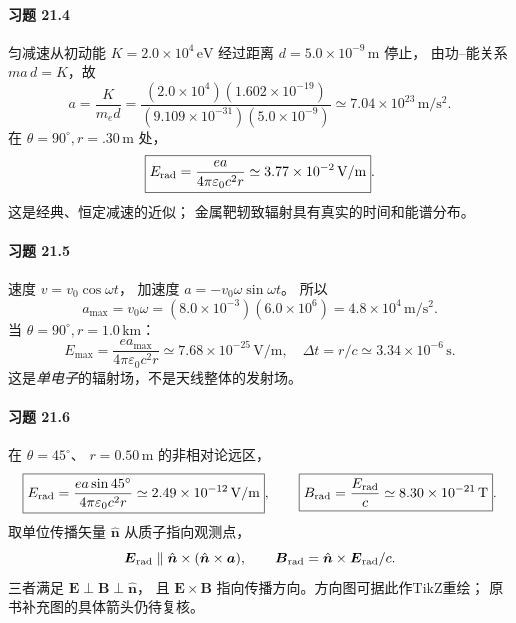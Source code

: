 \paragraph{习题 21.4}
匀减速从初动能 \(K=2.0\times10^4\,\mathrm{eV}\)
经过距离 \(d=5.0\times10^{-9}\,\mathrm m\) 停止，
由功--能关系
\(ma\,d=K\)，故
\[
a=\frac{K}{m_ed}
=\frac{(2.0\times10^4)(1.602\times10^{-19})}
{(9.109\times10^{-31})(5.0\times10^{-9})}
\simeq7.04\times10^{23}\,\mathrm{m/s^2}.
\]
在 \(\theta=90^\circ,r=.30\,\mathrm m\) 处，
\[
\boxed{E_{\rm rad}=
\frac{ea}{4\pi\varepsilon_0c^2r}
\simeq3.77\times10^{-2}\,\mathrm{V/m}}.
\]
这是经典、恒定减速的近似；
金属靶轫致辐射具有真实的时间和能谱分布。

\paragraph{习题 21.5}
速度 \(v=v_0\cos\omega t\)，
加速度 \(a=-v_0\omega\sin\omega t\)。
所以
\[
\boxed{a_{\max}=v_0\omega
=(8.0\times10^{-3})(6.0\times10^6)
=4.8\times10^4\,\mathrm{m/s^2}}.
\]
当 \(\theta=90^\circ,r=1.0\,\mathrm{km}\)：
\[
\boxed{E_{\max}=
\frac{ea_{\max}}{4\pi\varepsilon_0c^2r}
\simeq7.68\times10^{-25}\,\mathrm{V/m}},\quad
\boxed{\Delta t=r/c\simeq3.34\times10^{-6}\,\mathrm s}.
\]
这是\emph{单电子}的辐射场，不是天线整体的发射场。

\paragraph{习题 21.6}
在 \(\theta=45^\circ\)、
\(r=0.50\,\mathrm m\) 的非相对论远区，
\[
\boxed{E_{\rm rad}=
\frac{ea\sin45^\circ}{4\pi\varepsilon_0c^2r}
\simeq2.49\times10^{-12}\,\mathrm{V/m}},
\qquad
\boxed{B_{\rm rad}=\frac{E_{\rm rad}}c
\simeq8.30\times10^{-21}\,\mathrm T}.
\]
取单位传播矢量 \(\hat{\boldsymbol n}\) 从质子指向观测点，
\[
\boldsymbol E_{\rm rad}\parallel
\hat{\boldsymbol n}\times
(\hat{\boldsymbol n}\times\boldsymbol a),
\qquad
\boldsymbol B_{\rm rad}=\hat{\boldsymbol n}\times
\boldsymbol E_{\rm rad}/c.
\]
三者满足 \(\boldsymbol E\perp\boldsymbol B\perp\hat{\boldsymbol n}\)，
且 \(\boldsymbol E\times\boldsymbol B\)
指向传播方向。方向图可据此作TikZ重绘；
原书补充图的具体箭头仍待复核。

